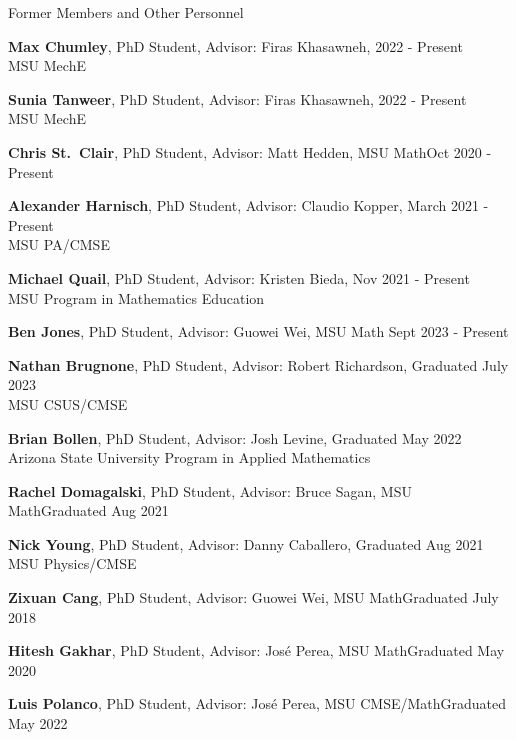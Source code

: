 \documentclass{resume} %
\begin{document}
\begin{rSection}{Former Members and Other Personnel}
\begin{list}{}{\leftmargin=1em}
   \item \textbf{Max Chumley}, PhD Student, Advisor: Firas Khasawneh, \hfill  2022 - Present\\
   \phantom{xxx}MSU MechE
   \item \textbf{Sunia Tanweer}, PhD Student, Advisor: Firas Khasawneh, \hfill  2022 - Present\\
   \phantom{xxx}MSU MechE
   \item \textbf{Chris St.~Clair}, PhD Student, Advisor: Matt Hedden, MSU Math\hfill Oct 2020 - Present
   \item \textbf{Alexander Harnisch}, PhD Student, Advisor: Claudio Kopper, \hfill March 2021 - Present\\
   \phantom{xxx} MSU PA/CMSE
   \item \textbf{Michael Quail}, PhD Student, Advisor: Kristen Bieda, \hfill Nov 2021 - Present\\
   \phantom{xxx} MSU Program in Mathematics Education
   \item \textbf{Ben Jones}, PhD Student, Advisor: Guowei Wei, MSU Math \hfill Sept 2023 - Present
   \item \textbf{Nathan Brugnone}, PhD Student, Advisor: Robert Richardson, \hfill  Graduated July 2023\\
   \phantom{xxx}MSU CSUS/CMSE 
    \item \textbf{Brian Bollen}, PhD Student, Advisor: Josh Levine, \hfill Graduated May 2022\\
    \phantom{xxx}Arizona State University Program in Applied Mathematics
   \item \textbf{Rachel Domagalski}, PhD Student, Advisor: Bruce Sagan, MSU Math\hfill Graduated Aug 2021
   \item \textbf{Nick Young}, PhD Student, Advisor: Danny Caballero, \hfill Graduated Aug 2021\\
   \phantom{xxx}MSU Physics/CMSE

   \item \textbf{Zixuan Cang}, PhD Student, Advisor: Guowei Wei, MSU Math\hfill Graduated July 2018

   \item \textbf{Hitesh Gakhar}, PhD Student, Advisor: Jos\'e Perea, MSU Math\hfill Graduated May 2020

   \item \textbf{Luis Polanco}, PhD Student, Advisor: Jos\'e Perea, MSU CMSE/Math\hfill Graduated May 2022


\end{list}
\end{rSection}
\end{document}
